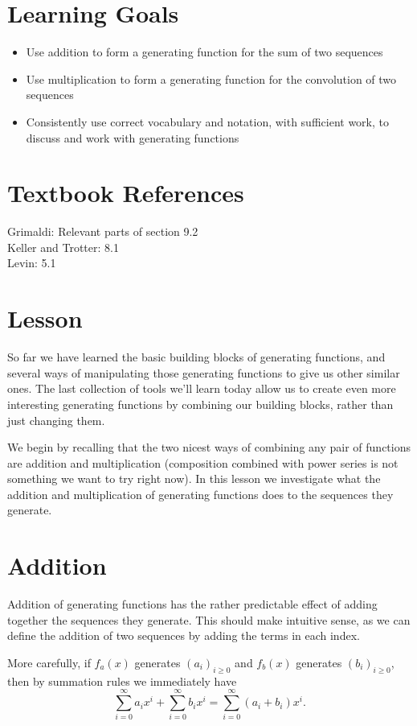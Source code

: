 \documentclass{article}
\theoremstyle{definition}
\begin{document}
\section*{Learning Goals}
\begin{itemize}
  \item Use addition to form a generating function for the sum of two sequences
  \item Use multiplication to form a generating function for the convolution of two sequences
  \item Consistently use correct vocabulary and notation, with sufficient work, to discuss and work with generating functions
\end{itemize}

\section*{Textbook References}
Grimaldi: Relevant parts of section 9.2\\
Keller and Trotter: 8.1\\
Levin: 5.1

\section*{Lesson}
So far we have learned the basic building blocks of generating functions, and several ways of manipulating those generating functions to give us other similar ones. The last collection of tools we'll learn today allow us to create even more interesting generating functions by combining our building blocks, rather than just changing them.

We begin by recalling that the two nicest ways of combining any pair of functions are addition and multiplication (composition combined with power series is not something we want to try right now). In this lesson we investigate what the addition and multiplication of generating functions does to the sequences they generate.

\section*{Addition}
Addition of generating functions has the rather predictable effect of adding together the sequences they generate. This should make intuitive sense, as we can define the addition of two sequences by adding the terms in each index.

More carefully, if $f_{a}(x)$ generates $\left(a_{i}\right)_{i \geq 0}$ and $f_{b}(x)$ generates $\left(b_{i}\right)_{i \geq 0}$, then by summation rules we immediately have
\[\sum_{i=0}^{\infty} a_{i} x^{i}+\sum_{i=0}^{\infty} b_{i} x^{i}=\sum_{i=0}^{\infty}\left(a_{i}+b_{i}\right) x^{i}.\]
\end{document}

